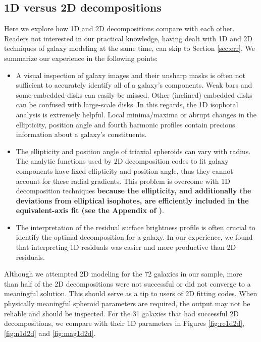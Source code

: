 \documentclass[preprint2]{emulateapj}
\begin{document}


\subsection{1D versus 2D decompositions}
Here we explore how 1D and 2D decompositions compare with each other. 
Readers not interested in our practical knowledge, 
having dealt with 1D and 2D techniques of galaxy modeling at the same time, can skip to Section \ref{sec:err}. 
We summarize our experience in the following points:
\begin{itemize}
\item A visual inspection of galaxy images and their unsharp masks is often not sufficient to accurately identify all of a galaxy's components. 
Weak bars and some embedded disks can easily be missed. 
Other (inclined) embedded disks can be confused with large-scale disks.
In this regards, the 1D isophotal analysis is extremely helpful. 
Local minima/maxima or abrupt changes in the ellipticity, position angle and fourth harmonic profiles contain precious information 
about a galaxy's constituents.
\item The ellipticity and position angle of triaxial spheroids can vary with radius.
The analytic functions used by 2D decomposition codes to fit galaxy components have fixed ellipticity and position angle, 
thus they cannot account for these radial gradients. 
This problem is overcome with 1D decomposition techniques 
{\bf because the ellipticity, and additionally the deviations from elliptical isophotes, 
are efficiently included in the equivalent-axis fit (see the Appendix of \citealt{ciambur2015})}.
\item The interpretation of the residual surface brightness profile is often crucial to identify the optimal decomposition for a galaxy. 
In our experience, we found that interpreting 1D residuals was easier and more productive than 2D residuals.
\end{itemize}
Although we attempted 2D modeling for the 72 galaxies in our sample, 
more than half of the 2D decompositions were not successful or did not converge to a meaningful solution. 
This should serve as a tip to users of 2D fitting codes. 
When physically meaningful spheroid parameters are required, 
the output may not be reliable and should be inspected.
For the 31 galaxies that had successful 2D decompositions, 
we compare with their 1D parameters in Figures \ref{fig:re1d2d}, \ref{fig:n1d2d} and \ref{fig:mag1d2d}.
\end{document}
